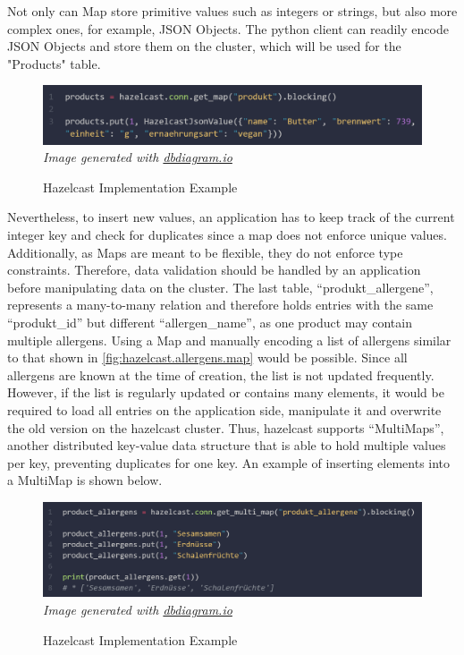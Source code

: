 Not only can Map store primitive values such as integers or strings, but also more complex ones, for 
example, JSON Objects. The python client can readily encode JSON Objects and store them on the cluster, 
which will be used for the "Products" table.

\begin{figure}[H]
    \caption{Hazelcast Implementation Example} \label{fig:hazelcast.products.map}
    \includegraphics[width=1\textwidth]{images/hazelcast.products.map.png}
    \small\textit{Image generated with \href{https://dbdiagram.io/}{dbdiagram.io}}
\end{figure}

\parencite{Hazelcast.PythonClient.HazelcastJsonValue}
Nevertheless, to insert new values, an application has to keep track of the current integer key and check 
for duplicates since a map does not enforce unique values. Additionally, as Maps are meant to be flexible, 
they do not enforce type constraints. Therefore, data validation should be handled by an application before 
manipulating data on the cluster.
The last table, \enquote{produkt\_allergene}, 
represents a many-to-many relation and therefore holds entries with the 
same \enquote{produkt\_id} but different \enquote{allergen\_name}, as one product may contain multiple allergens.
Using a Map and manually encoding a list of allergens similar to that shown in \autoref{fig:hazelcast.allergens.map} 
would be possible. Since all allergens are known at the time of creation, the 
list is not updated frequently. However, if the list is regularly updated or contains many elements, it 
would be required to load all entries on the application side, manipulate it and overwrite the old version 
on the hazelcast cluster. 
Thus, hazelcast supports \enquote{MultiMaps}, another distributed key-value data structure that is able to hold 
multiple values per key, preventing duplicates for one key. \textcite{Hazelcast.DataStructure.MultiMap} 
An example of inserting elements into a MultiMap is shown below.

\begin{figure}[H]
    \caption{Hazelcast Implementation Example} \label{fig:hazelcast.product_allergens.1.multimap}
    \includegraphics[width=1\textwidth]{images/hazelcast.product_allergens.multimap.1.png}
    \small\textit{Image generated with \href{https://dbdiagram.io/}{dbdiagram.io}}
\end{figure}

